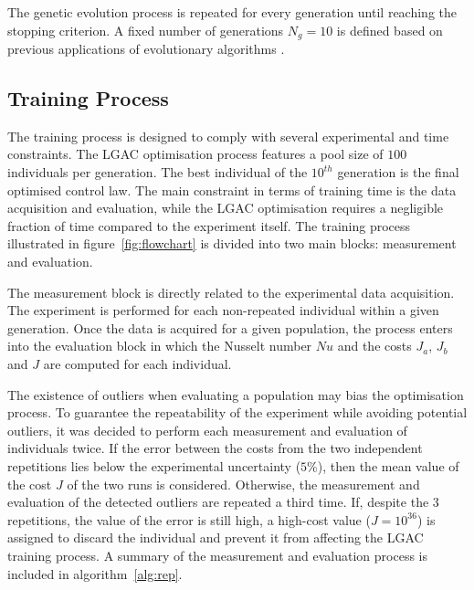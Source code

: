 The genetic evolution process is repeated for every generation until reaching the stopping criterion. A fixed number of generations $N_{g} = 10$ is defined based on previous applications of evolutionary algorithms \citep{Wu2018jet,cornejo2021gMLC,Yu2021GA_drag_slot_jets}.

\subsection{Training Process} \label{ss:training_standard}

The training process is designed to comply with several experimental and time constraints. The LGAC optimisation process features a pool size of $100$ individuals per generation. The best individual of the $10^{th}$ generation is the final optimised control law. The main constraint in terms of training time is the data acquisition and evaluation, while the LGAC optimisation requires a negligible fraction of time compared to the experiment itself. The training process illustrated in figure~\ref{fig:flowchart} is divided into two main blocks: measurement and evaluation. 

The measurement block is directly related to the experimental data acquisition. The experiment is performed for each non-repeated individual within a given generation. Once the data is acquired for a given population, the process enters into the evaluation block in which the Nusselt number $Nu$ and the costs $J_a$, $J_b$ and $J$ are computed for each individual. 

The existence of outliers when evaluating a population may bias the optimisation process. To guarantee the repeatability of the experiment while avoiding potential outliers, it was decided to perform each measurement and evaluation of individuals twice. If the error between the costs from the two independent repetitions lies below the experimental uncertainty ($5\%$), then the mean value of the cost $J$ of the two runs is considered. Otherwise, the measurement and evaluation of the detected outliers are repeated a third time. If, despite the 3 repetitions, the value of the error is still high, a high-cost value ($J = 10^{36}$) is assigned to discard the individual and prevent it from affecting the LGAC training process. A summary of the measurement and evaluation process is included in algorithm~\ref{alg:rep}.

